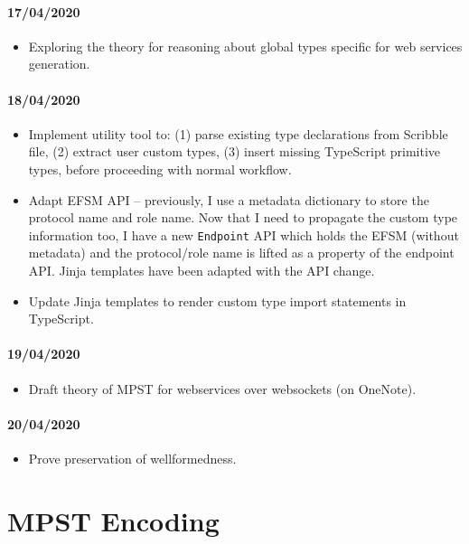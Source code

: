 \documentclass{article}
\begin{document}
\paragraph{17/04/2020}
\begin{itemize}
\item
Exploring the theory for reasoning about global types
specific for web services generation.
\end{itemize}

\paragraph{18/04/2020}
\begin{itemize}
\item
Implement utility tool to: (1) parse existing type declarations
from Scribble file, (2) extract user custom types,
(3) insert missing TypeScript primitive types, before proceeding
with normal workflow.

\item
Adapt EFSM API -- previously, I use a metadata dictionary
to store the protocol name and role name. Now that I need to
propagate the custom type information too, I have a new 
\texttt{Endpoint} API which holds the EFSM (without metadata)
and the protocol/role name is lifted as a property of the 
endpoint API. Jinja templates have been adapted with the
API change.

\item
Update Jinja templates to render custom type import
statements in TypeScript.
\end{itemize}

\paragraph{19/04/2020}
\begin{itemize}
\item
Draft theory of MPST for webservices over websockets 
(on OneNote).
\end{itemize}

\paragraph{20/04/2020}
\begin{itemize}
\item
Prove preservation of wellformedness.
\end{itemize}

\section{MPST Encoding}
\end{document}
